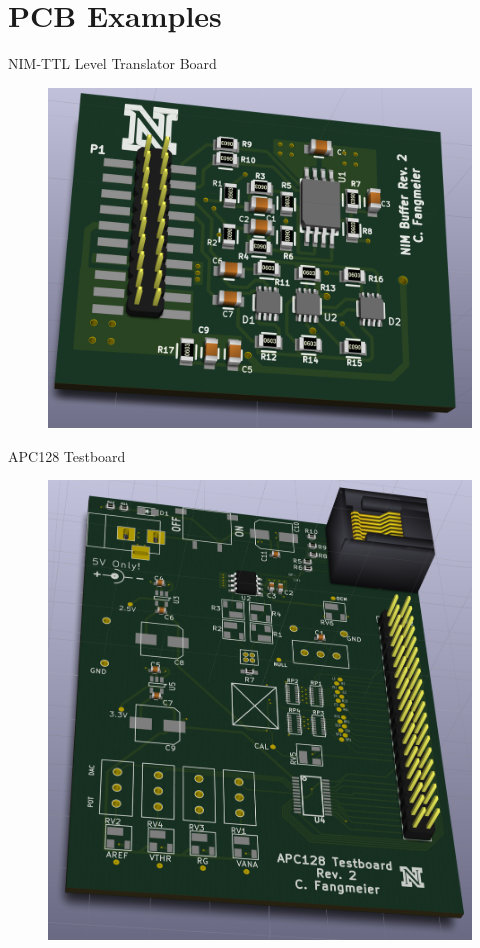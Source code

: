 \documentclass{beamer}
\begin{document}
\section{PCB Examples}
\begin{frame}{NIM-TTL Level Translator Board}
  \begin{figure}
    \includegraphics[height=0.8\textheight]{figures/NIM-LTB}
  \end{figure}
\end{frame}
\begin{frame}{APC128 Testboard}
  \begin{figure}
    \includegraphics[height=0.8\textheight]{figures/APC128-Testboard}
  \end{figure}
\end{frame}
\end{document}
